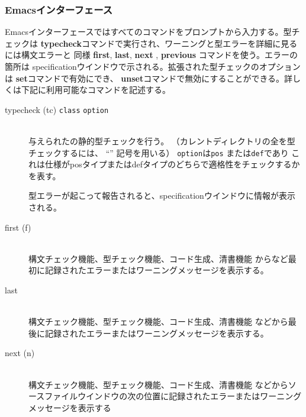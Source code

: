 \documentclass[\pformat,12pt]{jarticle}
\begin{document}
\subsubsection{Emacsインターフェース}


Emacsインターフェースではすべてのコマンドをプロンプトから入力する。型チェックは
 \textbf{typecheck}コマンドで実行され、ワーニングと型エラーを詳細に見るには構文エラーと
同様 \textbf{first},  \textbf{last},  \textbf{next} ,  \textbf{previous} コマンドを使う。エラーの箇所は
specificationウインドウで示される。拡張された型チェックのオプションは \textbf{set}コマンドで有効にでき、
 \textbf{unset}コマンドで無効にすることができる。詳しくは下記に利用可能なコマンドを記述する。

\begin{description}  

\item[typecheck (tc) 
{{\tt class}} {\tt option}]\mbox{}\\ 
  与えられたの静的型チェックを行う。
  （カレントディレクトリの全を型チェックするには、
  ``{\tt *}'' 記号を用いる）
  {\tt option}は{\tt pos} または{\tt def}であり
  これは仕様がposタイプまたはdefタイプのどちらで適格性をチェックするかを表す。

  型エラーが起こって報告されると、specificationウインドウに情報が表示される。

\item[first (f)] \mbox{}\\
  構文チェック機能、型チェック機能、コード生成、清書機能
  からなど最初に記録されたエラーまたはワーニングメッセージを表示する。

\item[last] \mbox{}\\
  構文チェック機能、型チェック機能、コード生成、清書機能
  などから最後に記録されたエラーまたはワーニングメッセージを表示する。

\item[next (n) ]\mbox{}\\
  構文チェック機能、型チェック機能、コード生成、清書機能
  などからソースファイルウインドウの次の位置に記録されたエラーまたはワーニングメッセージを表示する


\end{description}
\end{document}
